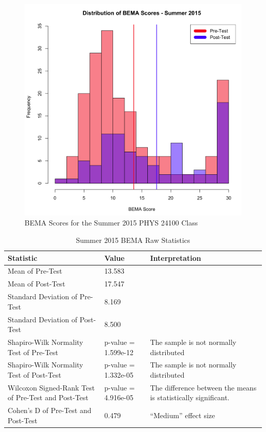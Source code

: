 \begin{figure}[!htb]
	\centering
	\includegraphics[width=6in]{img/chapter4/bema_summer_2015}
	\caption[BEMA Scores for the Summer 2015 PHYS 24100 Class]{BEMA Scores for the Summer 2015 PHYS 24100 Class}
  \label{fig:bemaSu15}
\end{figure}

\pagebreak

\begin{landscape}
\begin{table}[!ht]
  \centering
  \begin{tabular}{|l|l|l|}
    \hline
    \textbf{Statistic} & \textbf{Value} & \textbf{Interpretation}\\
	\hline
	Mean of Pre-Test & 13.583 & \\
	\hline
	Mean of Post-Test & 17.547 & \\
	\hline
	Standard Deviation of Pre-Test & 8.169 & \\
	\hline
	Standard Deviation of Post-Test & 8.500 & \\
	\hline
	Shapiro-Wilk Normality Test of Pre-Test & p-value = 1.599e-12 & The sample is not normally distributed \\
	\hline
	Shapiro-Wilk Normality Test of Post-Test & p-value = 1.332e-05 & The sample is not normally distributed \\
	\hline
	Wilcoxon Signed-Rank Test of Pre-Test and Post-Test & p-value = 4.916e-05 & The difference between the means is statistically significant. \\
	\hline
	Cohen's D of Pre-Test and Post-Test & 0.479 & ``Medium'' effect size \\
	\hline
  \end{tabular}
  \caption{Summer 2015 BEMA Raw Statistics}
  \label{tab:statsSu15}
\end{table}
\end{landscape}

